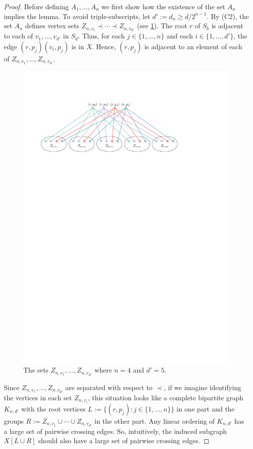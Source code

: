 \documentclass[kpfonts]{patmorin}
\renewcommand{\ge}{\geqslant}
\begin{document}
\begin{proof}
    Before defining $A_1,\ldots,A_n$ we first show how the existence of the set $A_n$ implies the lemma.  To avoid triple-subscripts, let $d':=d_n\ge d/2^{n-1}$. By (C2), the set $A_n$ defines vertex sets $Z_{n,v_1}\prec\cdots\prec Z_{n,v_{d'}}$ (see \cref{fig_twister}). The root $r$ of $S_b$ is adjacent to each of $v_{1},\ldots,v_{d'}$ in $S_d$. Thus, for each $j\in\{1,\ldots,n\}$ and each $i\in\{1,\ldots,d'\}$, the edge $(r,p_j)(v_i,p_j)$ is in $X$. Hence, $(r,p_j)$ is adjacent to an element of each of $Z_{n,v_1},\ldots,Z_{n,v_{d'}}$.
	\begin{figure}[!h]
		\centering\includegraphics{figs/twister}
		\caption{The sets $Z_{n,v_1},\ldots,Z_{n,v_{d'}}$ where $n=4$ and $d'=5$.}
		\label{fig_twister}
	\end{figure}

   Since $Z_{n,v_1},\ldots,Z_{n,v_{d'}}$ are separated with respect to $\prec$,
   if we imagine identifying the vertices in each set $Z_{n,v_i}$, this situation looks like a complete bipartite graph $K_{n,d'}$ with the root vertices $L:=\{(r,p_j):j\in\{1,\ldots,n\}\}$ in one part and the groups $R:=Z_{n,v_1}\cup\cdots\cup Z_{n,v_{d'}}$ in the other part.  Any linear ordering of $K_{n,d'}$ has a large set of pairwise crossing edges. So, intuitively, the induced subgraph $X[L\cup R]$ should also have a large set of pairwise crossing edges. 
   

\end{proof}
\end{document}
